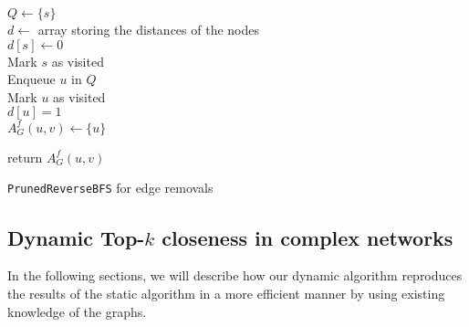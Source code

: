 \begin{algorithm2e}[h!]
 \label{alg:prunedReverseBFSRemovals}
   $Q \gets \{s\}$ \\
   $d \gets $ array storing the distances of the nodes \\
   $d[s] \gets 0$ \\
   Mark $s$ as visited \\
   
   Enqueue $u$ in $Q$ \label{alg:addingAdditionalNeighbor} \\
   Mark $u$ as visited  \\
   $d[u] = 1$  \\
   $A_G^f(u, v) \gets \{u\}$ \label{alg:addingAdditionalNeighborEnd} \\
   
   return $A_G^f(u, v)$ 
   
 \caption{\texttt{PrunedReverseBFS} for edge removals}
\end{algorithm2e}


\FloatBarrier
\subsection{Dynamic Top-$k$ closeness in complex networks}
\label{sec:dynamicTopKOptimizations}
In the following sections, we will describe how our dynamic algorithm reproduces the results of the static algorithm in a more efficient manner by using existing knowledge of the graphs.

